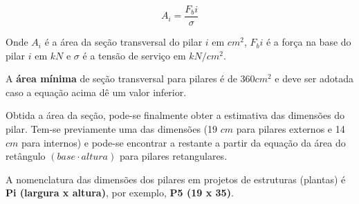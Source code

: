 $$A_i = \frac{F_bi}{\sigma}$$

Onde $A_i$ é a área da seção transversal do pilar $i$ em $cm^2$, $F_bi$ é a força na base do pilar $i$ em $kN$ e $\sigma$ é a tensão de serviço em $kN/cm^2$.

A \textbf{área mínima} de seção transversal para pilares é de $360 cm^2$ e deve ser adotada caso a equação acima dê um valor inferior.

Obtida a área da seção, pode-se finalmente obter a estimativa das dimensões do pilar. Tem-se previamente uma das dimensões (19 $cm$ para pilares externos e 14 $cm$ para internos) e pode-se encontrar a restante a partir da equação da área do retângulo $(base \cdot altura)$ para pilares retangulares.

A nomenclatura das dimensões dos pilares em projetos de estruturas (plantas) é \textbf{Pi (largura x altura)}, por exemplo, \textbf{P5 (19 x 35)}.
